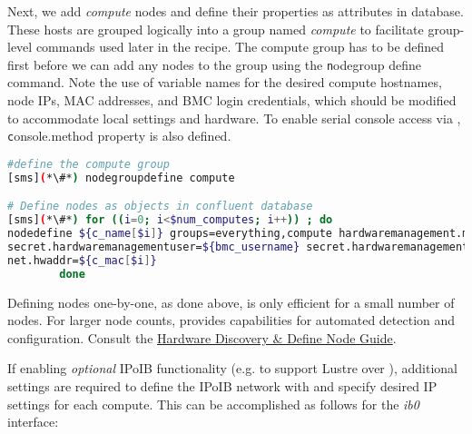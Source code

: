 
\noindent Next, we add {\em compute} nodes and define their properties as
attributes in \Confluent{} database.
These hosts are grouped logically into a group named {\em
compute} to facilitate group-level commands used later in the recipe. The compute
group has to be defined first before we can add any nodes to the group using the 
{\texttt nodegroup define} command. Note the
use of variable names for the desired compute hostnames, node IPs, MAC
addresses, and BMC login credentials, which should be modified to accommodate
local settings and hardware. To enable serial console access via  \Confluent{},
{\texttt console.method}
property is also defined. 

\begin{lstlisting}[language=bash,keywords={},upquote=true,basicstyle=\footnotesize\ttfamily,]
#define the compute group
[sms](*\#*) nodegroupdefine compute

# Define nodes as objects in confluent database
[sms](*\#*) for ((i=0; i<$num_computes; i++)) ; do
nodedefine ${c_name[$i]} groups=everything,compute hardwaremanagement.manager=${c_bmc[$i]} \ 
secret.hardwaremanagementuser=${bmc_username} secret.hardwaremanagementpassword=${bmc_password} \ 
net.hwaddr=${c_mac[$i]}
        done
\end{lstlisting}

\begin{center}
  \begin{tcolorbox}[]
    \small
Defining nodes one-by-one, as done above, is only efficient
for a small number of nodes. For larger node counts,
\Confluent{} provides capabilities for automated detection and
configuration.
Consult the
\href{https://hpc.lenovo.com/users/documentation/confluentdisco.html}{\color{blue}\xCAT{}
Hardware Discovery \& Define Node Guide}.
\end{tcolorbox}
\end{center}

If enabling {\em optional} IPoIB functionality (e.g. to support Lustre over \InfiniBand{}), additional
settings are required to define the IPoIB network with \Confluent{} and specify
desired IP settings for each compute. This can be accomplished as follows for
the {\em ib0} interface:

